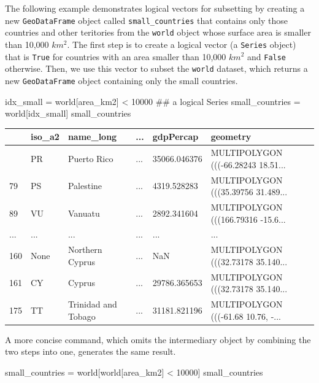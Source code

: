 \documentclass[
  letterpaper,
]{krantz}
\newenvironment{Shaded}{\begin{snugshade}}{\end{snugshade}}
\newcommand{\CommentTok}[1]{\textcolor[rgb]{0.37,0.37,0.37}{#1}}
\newcommand{\DecValTok}[1]{\textcolor[rgb]{0.68,0.00,0.00}{#1}}
\newcommand{\NormalTok}[1]{\textcolor[rgb]{0.00,0.23,0.31}{#1}}
\newcommand{\OperatorTok}[1]{\textcolor[rgb]{0.37,0.37,0.37}{#1}}
\newcommand{\StringTok}[1]{\textcolor[rgb]{0.13,0.47,0.30}{#1}}
\begin{document}
The following example demonstrates logical vectors for subsetting by
creating a new \texttt{GeoDataFrame} object called
\texttt{small\_countries} that contains only those countries and other
teritories from the \texttt{world} object whose surface area is smaller
than 10,000 \(km^2\). The first step is to create a logical vector (a
\texttt{Series} object) that is \texttt{True} for countries with an area
smaller than 10,000 \(km^2\) and \texttt{False} otherwise. Then, we use
this vector to subset the \texttt{world} dataset, which returns a new
\texttt{GeoDataFrame} object containing only the small countries.

\begin{Shaded}
\begin{Highlighting}[]
\NormalTok{idx\_small }\OperatorTok{=}\NormalTok{ world[}\StringTok{\textquotesingle{}area\_km2\textquotesingle{}}\NormalTok{] }\OperatorTok{\textless{}} \DecValTok{10000}  \CommentTok{\#\# a logical \textquotesingle{}Series\textquotesingle{}}
\NormalTok{small\_countries }\OperatorTok{=}\NormalTok{ world[idx\_small]}
\NormalTok{small\_countries}
\end{Highlighting}
\end{Shaded}

\begin{longtable}[]{@{}llllll@{}}
\toprule\noalign{}
& iso\_a2 & name\_long & ... & gdpPercap & geometry \\
\midrule\noalign{}
\endhead
\bottomrule\noalign{}
\endlastfoot
45 & PR & Puerto Rico & ... & 35066.046376 & MULTIPOLYGON (((-66.28243
18.51... \\
79 & PS & Palestine & ... & 4319.528283 & MULTIPOLYGON (((35.39756
31.489... \\
89 & VU & Vanuatu & ... & 2892.341604 & MULTIPOLYGON (((166.79316
-15.6... \\
... & ... & ... & ... & ... & ... \\
160 & None & Northern Cyprus & ... & NaN & MULTIPOLYGON (((32.73178
35.140... \\
161 & CY & Cyprus & ... & 29786.365653 & MULTIPOLYGON (((32.73178
35.140... \\
175 & TT & Trinidad and Tobago & ... & 31181.821196 & MULTIPOLYGON
(((-61.68 10.76, -... \\
\end{longtable}

A more concise command, which omits the intermediary object by combining
the two steps into one, generates the same result.

\begin{Shaded}
\begin{Highlighting}[]
\NormalTok{small\_countries }\OperatorTok{=}\NormalTok{ world[world[}\StringTok{\textquotesingle{}area\_km2\textquotesingle{}}\NormalTok{] }\OperatorTok{\textless{}} \DecValTok{10000}\NormalTok{]}
\NormalTok{small\_countries}
\end{Highlighting}
\end{Shaded}
\end{document}
